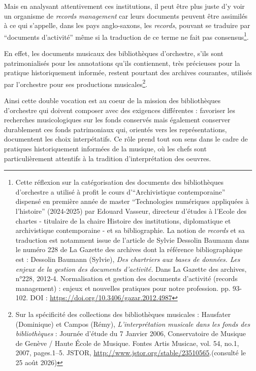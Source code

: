 Mais en analysant attentivement ces institutions, il peut être plus juste d'y voir un organisme de \textit{records management} car leurs documents peuvent être assimilés à ce qui s'appelle, dans les pays anglo-saxons, les \textit{records}, pouvant se traduire par \enquote{documents d'activité} même si la traduction de ce terme ne fait pas consensus\footnote{Cette réflexion sur la catégorisation des documents des bibliothèques d'orchestre a utilisé à profit le cours d'\enquote{Archivistique contemporaine} dispensé en première année de master \enquote{Technologies numériques appliquées à l'histoire} (2024-2025) par Edouard Vasseur, directeur d'études à l'Ecole des chartes - titulaire de la chaire Histoire des institutions, diplomatique et archivistique contemporaine - et sa bibliographie. La notion de \textit{records} et sa traduction est notamment issue de l'article de Sylvie Dessolin Baumann dans le numéro 228 de La Gazette des archives dont la référence bibliographique est : Dessolin Baumann (Sylvie),\textit{ Des chartriers aux bases de données. Les enjeux de la gestion des documents d’activité.} Dans La Gazette des archives, n°228, 2012-4. Normalisation et gestion des documents d’activité (records management) : enjeux et nouvelles pratiques pour notre profession. pp. 93-102. DOI : \url{https://doi.org/10.3406/gazar.2012.4987}}. 


En effet, les documents musicaux des bibliothèques d'orchestre, s'ils sont patrimonialisés pour les annotations qu'ils contiennent, très précieuses pour la pratique historiquement informée, restent pourtant des archives courantes, utilisés par l'orchestre pour ses productions musicales\footnote{Sur la spécificité des collections des bibliothèques musicales : Hausfater (Dominique) et Campos (Rémy), \textit{L’interprétation musicale dans les fonds des bibliothèques }: Journée d’étude du 7 Janvier 2006, Conservatoire de Musique de Genève / Haute École de Musique. Fontes Artis Musicae, vol. 54, no.1, 2007, pages.1–5. JSTOR, \url{http://www.jstor.org/stable/23510565}.(consulté le 25 août 2026)}. 

Ainsi cette double vocation est au coeur de la mission des bibliothèques d'orchestre qui doivent composer avec des exigences différentes : favoriser les recherches musicologiques sur les fonds conservés mais également conserver durablement ces fonds patrimoniaux qui, orientés vers les représentations, documentent les choix interpétatifs. Ce rôle prend tout son sens dans le cadre de pratiques historiquement informées de la musique, où les chefs sont particulièrement attentifs à la tradition d'interprétation des oeuvres. 



